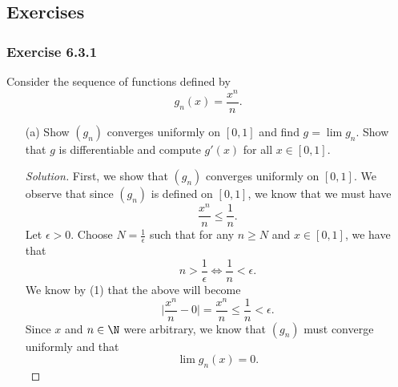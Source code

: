 \subsection{Exercises}

\subsubsection{Exercise 6.3.1} Consider the sequence of functions defined by
\[  g_n(x) = \frac{ x^n  }{ n  }. \]
\begin{enumerate}
    \item[(a)] Show \( (g_n)  \) converges uniformly on \( [0,1]  \) and find \( g = \lim g_n  \). Show that \( g  \) is differentiable and compute \( g'(x)  \) for all \( x \in [0,1]  \).
        \begin{proof}[Solution]
            First, we show that \( (g_n)  \) converges uniformly on \( [0,1] \). We observe that since \( (g_n)  \) is defined on \( [0,1]  \), we know that we must have
            \[  \frac{ x^n  }{ n  } \leq \frac{ 1 }{ n }. \tag{1} \]
            Let \( \epsilon > 0  \). Choose \( N = \frac{ 1 }{ \epsilon  }  \) such that for any \( n \geq N  \) and \( x \in [0,1] \), we have that 
            \[ n > \frac{ 1 }{ \epsilon  } \iff \frac{ 1 }{ n } < \epsilon. \]
            We know by (1) that the above will become
            \[   \Big| \frac{ x^n }{ n } - 0  \Big|   = \frac{ x^n  }{ n } \leq \frac{ 1 }{ n } < \epsilon.  \]
            Since \( x  \) and \( n \in \N  \) were arbitrary, we know that \( (g_n)  \) must converge uniformly and that 
            \[  \lim g_n(x) = 0. \]
           

\end{proof}
\end{enumerate}
